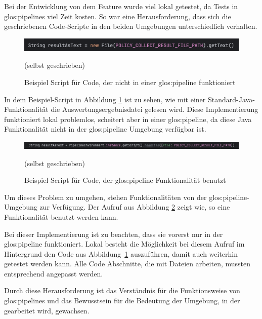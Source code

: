 \documentclass[../main.tex]{subfiles}
\begin{document}
Bei der Entwicklung von dem Feature wurde viel lokal getestet, da Tests in \glspl{glos:pipeline} viel Zeit kosten.
So war eine Herausforderung, dass sich die geschriebenen Code-Scripte in den beiden Umgebungen unterschiedlich verhalten.

\begin{figure}[ht]
    \centering
    \includegraphics[scale=0.45]{bilder/codebad.png}
    \caption{Beispiel Script für Code, der nicht in einer \gls{glos:pipeline} funktioniert}
    \footnotesize (selbst geschrieben)
    \label{fig:codebad}
\end{figure}


In dem Beispiel-Script in Abbildung \ref{fig:codebad} ist zu sehen, wie mit einer Standard-Java-Funktionalität die Auswertungsergebnisdatei gelesen wird.
Diese Implementierung funktioniert lokal problemlos, scheitert aber in einer \gls{glos:pipeline}, da diese Java Funktionalität nicht in der \gls{glos:pipeline} Umgebung verfügbar ist.

\begin{figure}[ht]
    \centering
    \includegraphics[scale=0.45]{bilder/codegood.png}
    \caption{Beispiel Script für Code, der \gls{glos:pipeline} Funktionalität benutzt}
    \footnotesize (selbst geschrieben)
    \label{fig:codegood}
\end{figure}
        
Um dieses Problem zu umgehen, stehen Funktionalitäten von der \gls{glos:pipeline}-Umgebung zur Verfügung.
Der Aufruf aus Abbildung \ref{fig:codegood} zeigt wie, so eine Funktionalität benutzt werden kann.

Bei dieser Implementierung ist zu beachten, dass sie vorerst nur in der \gls{glos:pipeline} funktioniert.
Lokal besteht die Möglichkeit bei diesem Aufruf im Hintergrund den Code aus Abbildung \ref{fig:codebad} auszuführen, damit auch weiterhin getestet werden kann.
Alle Code Abschnitte, die mit Dateien arbeiten, mussten entsprechend angepasst werden.

Durch diese Herausforderung ist das Verständnis für die Funktionsweise von \glspl{glos:pipeline} und das Bewusstsein für die Bedeutung der Umgebung, in der gearbeitet wird, gewachsen.
\end{document}

